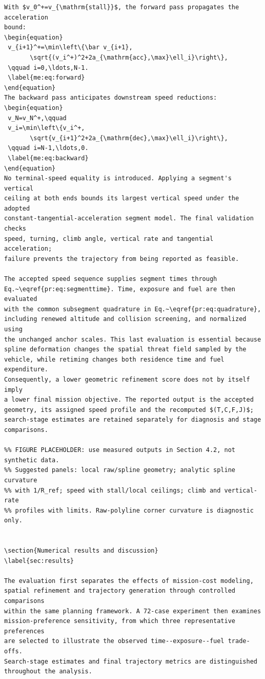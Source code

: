 \documentclass[12pt]{article}
\begin{document}
\begin{verbatim}
With $v_0^+=v_{\mathrm{stall}}$, the forward pass propagates the acceleration
bound:
\begin{equation}
 v_{i+1}^+=\min\left\{\bar v_{i+1},
       \sqrt{(v_i^+)^2+2a_{\mathrm{acc},\max}\ell_i}\right\},
 \qquad i=0,\ldots,N-1.
 \label{me:eq:forward}
\end{equation}
The backward pass anticipates downstream speed reductions:
\begin{equation}
 v_N=v_N^+,\qquad
 v_i=\min\left\{v_i^+,
       \sqrt{v_{i+1}^2+2a_{\mathrm{dec},\max}\ell_i}\right\},
 \qquad i=N-1,\ldots,0.
 \label{me:eq:backward}
\end{equation}
No terminal-speed equality is introduced. Applying a segment's vertical
ceiling at both ends bounds its largest vertical speed under the adopted
constant-tangential-acceleration segment model. The final validation checks
speed, turning, climb angle, vertical rate and tangential acceleration;
failure prevents the trajectory from being reported as feasible.

The accepted speed sequence supplies segment times through
Eq.~\eqref{pr:eq:segmenttime}. Time, exposure and fuel are then evaluated
with the common subsegment quadrature in Eq.~\eqref{pr:eq:quadrature},
including renewed altitude and collision screening, and normalized using
the unchanged anchor scales. This last evaluation is essential because
spline deformation changes the spatial threat field sampled by the
vehicle, while retiming changes both residence time and fuel expenditure.
Consequently, a lower geometric refinement score does not by itself imply
a lower final mission objective. The reported output is the accepted
geometry, its assigned speed profile and the recomputed $(T,C,F,J)$;
search-stage estimates are retained separately for diagnosis and stage comparisons.

%% FIGURE PLACEHOLDER: use measured outputs in Section 4.2, not synthetic data.
%% Suggested panels: local raw/spline geometry; analytic spline curvature
%% with 1/R_ref; speed with stall/local ceilings; climb and vertical-rate
%% profiles with limits. Raw-polyline corner curvature is diagnostic only.


\section{Numerical results and discussion}
\label{sec:results}

The evaluation first separates the effects of mission-cost modeling,
spatial refinement and trajectory generation through controlled comparisons
within the same planning framework. A 72-case experiment then examines
mission-preference sensitivity, from which three representative preferences
are selected to illustrate the observed time--exposure--fuel trade-offs.
Search-stage estimates and final trajectory metrics are distinguished
throughout the analysis.


\end{verbatim}
\end{document}
